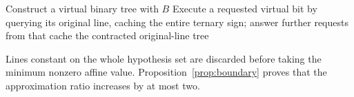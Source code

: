 \begin{algorithm}[H]
\caption{Transfer a binary algorithm to on-line outcomes}
\label{alg:boundary}
Construct a virtual binary tree with $B$\;
Execute a requested virtual bit by querying its original line,
caching the entire ternary sign; answer further requests from that cache\;
\KwRet the contracted original-line tree\;
\end{algorithm}

Lines constant on the whole hypothesis set are discarded before taking
the minimum nonzero affine value. Proposition~\ref{prop:boundary}
proves that the approximation ratio increases by at most two.
